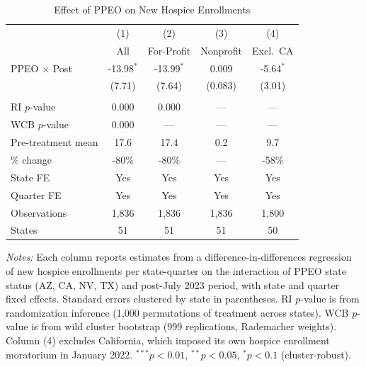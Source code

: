 \begin{table}[htbp]
\centering
\caption{Effect of PPEO on New Hospice Enrollments}
\label{tab:main_did}
\begin{tabular}{lcccc}
\toprule
 & (1) & (2) & (3) & (4) \\
 & All & For-Profit & Nonprofit & Excl.\ CA \\
\midrule
PPEO $\times$ Post & -13.98$^{*}$ & -13.99$^{*}$ & 0.009 & -5.64$^{*}$ \\
 & (7.71) & (7.64) & (0.083) & (3.01) \\
 & & & & \\
RI $p$-value & 0.000 & 0.000 & --- & --- \\
WCB $p$-value & 0.000 & --- & --- & --- \\[6pt]
Pre-treatment mean & 17.6 & 17.4 & 0.2 & 9.7 \\
\% change & -80\% & -80\% & --- & -58\% \\[6pt]
State FE & Yes & Yes & Yes & Yes \\
Quarter FE & Yes & Yes & Yes & Yes \\
Observations & 1,836 & 1,836 & 1,836 & 1,800 \\
States & 51 & 51 & 51 & 50 \\
\bottomrule
\end{tabular}
\vspace{0.5em}
\begin{minipage}{\textwidth}
\small \textit{Notes:} Each column reports estimates from a difference-in-differences regression of new hospice enrollments per state-quarter on the interaction of PPEO state status (AZ, CA, NV, TX) and post-July 2023 period, with state and quarter fixed effects. Standard errors clustered by state in parentheses. RI $p$-value is from randomization inference (1,000 permutations of treatment across states). WCB $p$-value is from wild cluster bootstrap (999 replications, Rademacher weights). Column (4) excludes California, which imposed its own hospice enrollment moratorium in January 2022. $^{***}p<0.01$, $^{**}p<0.05$, $^{*}p<0.1$ (cluster-robust).
\end{minipage}
\end{table}
